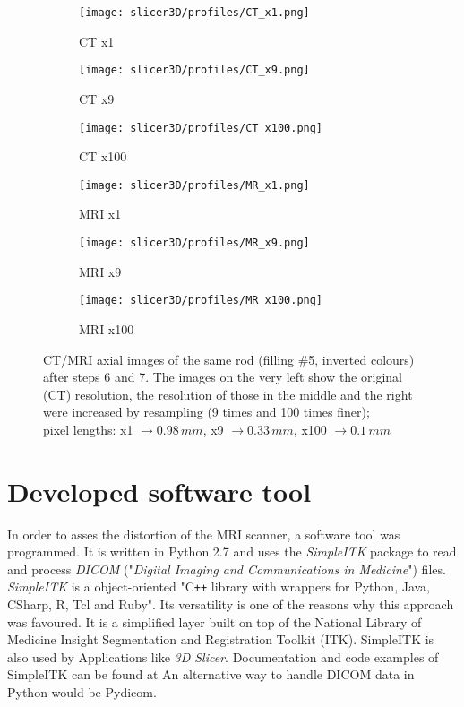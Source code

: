 \begin{figure}[!thb]
  \begin{subfigure}[b]{0.32\textwidth}
    \texttt{[image: slicer3D/profiles/CT\_x1.png]}
    \caption{CT x1}
    \label{fig:CT_x1}
  \end{subfigure}
  \hfill
  \begin{subfigure}[b]{0.32\textwidth}
    \texttt{[image: slicer3D/profiles/CT\_x9.png]}
    \caption{CT x9}
    \label{fig:CT_x9}
  \end{subfigure}
    \hfill
  \begin{subfigure}[b]{0.32\textwidth}
    \texttt{[image: slicer3D/profiles/CT\_x100.png]}
    \caption{CT x100}
    \label{fig:CT_x100}
  \end{subfigure}
  \begin{subfigure}[b]{0.32\textwidth}
    \texttt{[image: slicer3D/profiles/MR\_x1.png]}
    \caption{MRI x1}
    \label{fig:MRI_x1}
  \end{subfigure}
  \hfill
  \begin{subfigure}[b]{0.32\textwidth}
    \texttt{[image: slicer3D/profiles/MR\_x9.png]}
    \caption{MRI x9}
    \label{fig:MRI_x9}
  \end{subfigure}
    \hfill
  \begin{subfigure}[b]{0.32\textwidth}
    \texttt{[image: slicer3D/profiles/MR\_x100.png]}
    \caption{MRI x100}
    \label{fig:MRI_x100}
  \end{subfigure}
  \caption{CT/MRI axial images of the same rod (filling \#5, inverted colours) after steps 6 and 7. The images on the very left show the original (CT) resolution, the resolution of those in the middle and the right were increased by resampling (9 times and 100 times finer);\\ pixel lengths: x1 $\rightarrow 0.98\, mm$, x9 $\rightarrow0.33\, mm$, x100 $\rightarrow0.1\, mm$  }
  \label{fig:resample}
\end{figure}
\clearpage

\section{Developed software tool}

In order to asses the distortion of the MRI scanner, a software tool was programmed.
It is written in Python 2.7 and uses the \textit{SimpleITK} package to read and process \textit{DICOM} ("\textit{Digital Imaging and Communications in Medicine}") files. \cite{Python, DICOM}
\textit{SimpleITK} is a object-oriented "C\texttt{++} library with wrappers for Python, Java, CSharp, R, Tcl and Ruby". \cite{SimpleITK, SimpleITK_started} Its versatility is one of the reasons why this approach was favoured.
It is a simplified layer built on top of the National Library of Medicine Insight Segmentation and Registration Toolkit (ITK). SimpleITK is also used by Applications like \textit{3D Slicer}.
Documentation and code examples of SimpleITK can be found at \cite{InsightSoftwareConsortium, Kyriakou-SimpleITK}
An alternative way to handle DICOM data in Python would be Pydicom. \cite{Pydicom, Kyriakou-Pydicom-VTK} 

